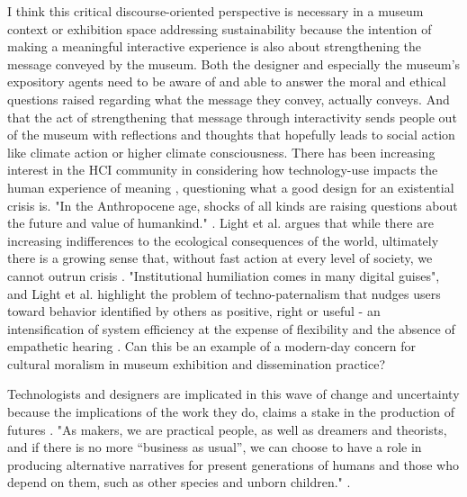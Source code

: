 I think this critical discourse-oriented perspective is necessary in a museum context or exhibition space addressing sustainability because the intention of making a meaningful interactive experience is also about strengthening the message conveyed by the museum. Both the designer and especially the museum's expository agents need to be aware of and able to answer the moral and ethical questions raised regarding what the message they convey, actually conveys. And that the act of strengthening that message through interactivity sends people out of the museum with reflections and thoughts that hopefully leads to social action like climate action or higher climate consciousness. There has been increasing interest in the HCI community in considering how technology-use impacts the human experience of meaning \autocite{light_design_2017}, questioning what a good design for an existential crisis is. "In the Anthropocene age, shocks of all kinds are raising questions about the future and value of humankind." \autocite[p. 723]{light_design_2017}. Light et al. argues that while there are increasing indifferences to the ecological consequences of the world, ultimately there is a growing sense that, without fast action at every level of society, we cannot outrun crisis \autocite[p. 723]{light_design_2017}. "Institutional humiliation comes in many digital guises", and Light et al. highlight the problem of techno-paternalism that nudges users toward behavior identified by others as positive, right or useful - an intensification of system efficiency at the expense of flexibility and the absence of empathetic hearing \autocite[p. 727]{light_design_2017}. Can this be an example of a modern-day concern for cultural moralism in museum exhibition and dissemination practice? 

Technologists and designers are implicated in this wave of change and uncertainty because the implications of the work they do, claims a stake in the production of futures \autocite[p. 723]{light_design_2017}. "As makers, we are practical people, as well as dreamers and theorists, and if there is no more “business as usual”, we can choose to have a role in producing alternative narratives for present generations of humans and those who depend on them, such as other species and unborn children." \autocite[p. 723]{light_design_2017}.

